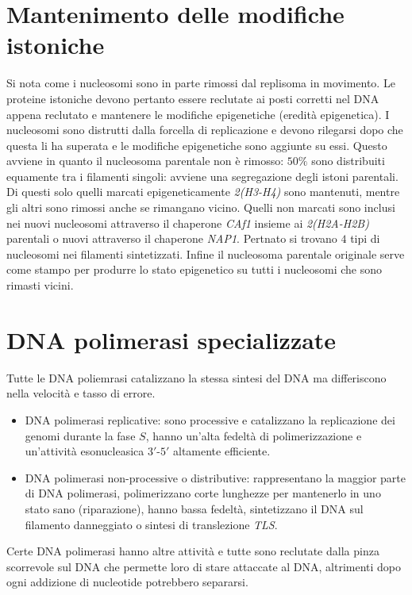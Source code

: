 \section{Mantenimento delle modifiche istoniche}
Si nota come i nucleosomi sono in parte rimossi dal replisoma in movimento. Le proteine istoniche devono pertanto essere reclutate ai posti corretti nel DNA appena reclutato e mantenere
le modifiche epigenetiche (eredit\`a epigenetica). I nucleosomi sono distrutti dalla forcella di replicazione e devono rilegarsi dopo che questa li ha superata e le modifiche epigenetiche
sono aggiunte su essi. Questo avviene in quanto il nucleosoma parentale non \`e rimosso: $50\%$ sono distribuiti equamente tra i filamenti singoli: avviene una segregazione degli istoni
parentali. Di questi solo quelli marcati epigeneticamente \emph{2(H3-H4)} sono mantenuti, mentre gli altri sono rimossi anche se rimangano vicino. Quelli non marcati sono inclusi 
nei nuovi nucleosomi attraverso il chaperone \emph{CAf1} insieme ai \emph{2(H2A-H2B)} parentali o nuovi attraverso il chaperone \emph{NAP1}. Pertnato si trovano $4$ tipi di nucleosomi
nei filamenti sintetizzati. Infine il nucleosoma parentale originale serve come stampo per produrre lo stato epigenetico su tutti i nucleosomi che sono rimasti vicini. 
\section{DNA polimerasi specializzate}
Tutte le DNA poliemrasi catalizzano la stessa sintesi del DNA ma differiscono nella velocit\`a e tasso di errore. 
\begin{itemize}
	\item DNA polimerasi replicative: sono processive e catalizzano la replicazione dei genomi durante la fase $S$, hanno un'alta fedelt\`a di polimerizzazione e un'attivit\`a
		esonucleasica $3'$-$5'$ altamente efficiente. 
	\item DNA polimerasi non-processive o distributive: rappresentano la maggior parte di DNA polimerasi, polimerizzano corte lunghezze per mantenerlo in uno stato sano (riparazione),
		hanno bassa fedelt\`a, sintetizzano il DNA sul filamento danneggiato o sintesi di translezione \emph{TLS}.
\end{itemize}
Certe DNA polimerasi hanno altre attivit\`a e tutte sono reclutate dalla pinza scorrevole sul DNA che permette loro di stare attaccate al DNA, altrimenti dopo ogni addizione di 
nucleotide potrebbero separarsi. 
